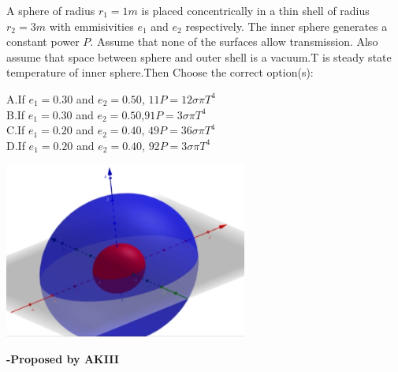 \documentclass[11pt,a4paper]{scrartcl}
\begin{document}
\begin{problem}

A sphere of radius $r_1=1m$ is placed concentrically in a thin shell of radius $r_2=3m$ with emmisivities $e_1$ and $e_2$ respectively. The inner sphere generates a constant power $P$. Assume that none of the surfaces allow transmission. Also assume that space between sphere and outer shell is a vacuum.T is steady state temperature of inner sphere.Then Choose the correct option(s):\

A.If $e_1=0.30$ and $e_2=0.50$, \hspace{0.3cm}$11P=12\sigma\pi{T}^4$ \\

B.If $e_1=0.30$ and $e_2=0.50$,\hspace{0.3cm}$91P=3\sigma\pi{T}^4$ \\

C.If $e_1=0.20$ and $e_2=0.40$,\hspace{0.3cm} $49P=36 \sigma\pi{T}^4$ \\

D.If $e_1=0.20$ and $e_2=0.40$,\hspace{0.3cm} $92P=3\sigma\pi{T}^4$ \\

\begin{center}

 \includegraphics[width=0.6\textwidth]{akiii.png}
\end{center}

\end{problem}
\begin{flushright}
\textbf{\Large{-Proposed by AKIII}}
\end{flushright}
\end{document}
